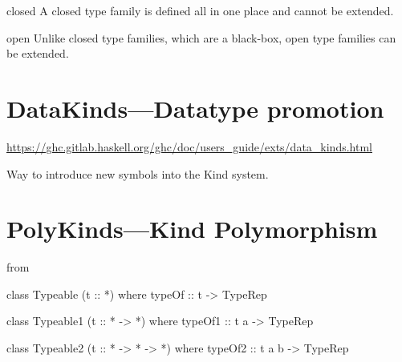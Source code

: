 \documentclass[openany, 12pt]{book}
\begin{document}
\begin{definition}{closed}{}
	A closed type family is defined all in one place and cannot be extended.
\end{definition}

\begin{definition}{open}{}
	Unlike closed type families, which are a black-box, open type families can be extended.
\end{definition}


\chapter{DataKinds---Datatype promotion}
\url{https://ghc.gitlab.haskell.org/ghc/doc/users_guide/exts/data_kinds.html}

Way to introduce new symbols into the Kind system.

\setcounter{chapter}{13}
\chapter{PolyKinds---Kind Polymorphism}
from
\begin{haskell}{}
class Typeable (t :: *) where
    typeOf :: t -> TypeRep

class Typeable1 (t :: * -> *) where
    typeOf1 :: t a -> TypeRep

class Typeable2 (t :: * -> * -> *) where
    typeOf2 :: t a b -> TypeRep
\end{haskell}
\end{document}
